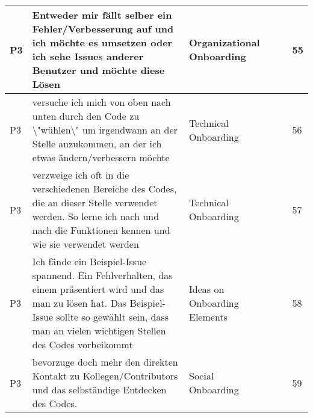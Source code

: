 \begin{appendices}
\begin{landscape}
\begin{longtable}{|p{0.8cm}|p{7cm}|p{3cm}|p{3cm}|p{5.5cm}|p{0.5cm}|}
      P3                   & Entweder mir fällt selber ein Fehler/Verbesserung auf und ich möchte es umsetzen oder ich sehe Issues anderer Benutzer und möchte diese Lösen                                                                                                                               & Organizational Onboarding                &                                    &                                                                                                                                                    & 55           \\ \hline
      P3                   & versuche ich mich von oben nach unten durch den Code zu \textbackslash{}"wühlen\textbackslash{}" um irgendwann an der Stelle anzukommen, an der ich etwas ändern/verbessern möchte                                                                                          & Technical Onboarding                     &                                    &                                                                                                                                                    & 56           \\ \hline
      P3                   & verzweige ich oft in die verschiedenen Bereiche des Codes, die an dieser Stelle verwendet werden. So lerne ich nach und nach die Funktionen kennen und wie sie verwendet werden                                                                                             & Technical Onboarding                     &                                    &                                                                                                                                                    & 57           \\ \hline
      P3                   & Ich fände ein Beispiel-Issue spannend. Ein Fehlverhalten, das einem präsentiert wird und das man zu lösen hat. Das Beispiel-Issue sollte so gewählt sein, dass man an vielen wichtigen Stellen des Codes vorbeikommt                                                        & Ideas on Onboarding Elements             &                                    &                                                                                                                                                    & 58           \\ \hline
      P3                   & bevorzuge doch mehr den direkten Kontakt zu Kollegen/Contributors und das selbständige Entdecken des Codes.                                                                                                                                                                 & Social Onboarding                        &                                    &                                                                                                                                                    & 59           \\ \hline

\end{longtable}
\end{landscape}
\end{appendices}
